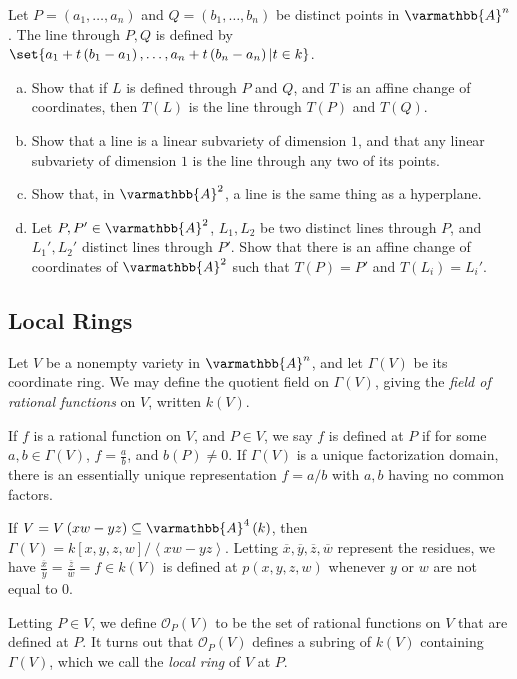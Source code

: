 \documentclass[10pt]{mypackage}
\renewcommand*{\mathbb}[1]{\varmathbb{#1}}
\newcommand{\A}{\mathbb{A}}
\begin{document}
\begin{exercise}[Exercise 2.15]
  Let $P = \left( a_1,\dots,a_n \right)$ and $Q = \left( b_1,\dots,b_n \right)$ be distinct points in $\A^n$. The line through $P,Q$ is defined by $\set{a_1 + t\left( b_1-a_1 \right),\dots,a_n + t\left( b_n-a_n \right) | t\in k}$.
  \begin{enumerate}[(a)]
    \item Show that if $L$ is defined through $P$ and $Q$, and $T$ is an affine change of coordinates, then $T(L)$ is the line through $T(P)$ and $T(Q)$.
    \item Show that a line is a linear subvariety of dimension $1$, and that any linear subvariety of dimension $1$ is the line through any two of its points.
    \item Show that, in $\A^2$, a line is the same thing as a hyperplane.
    \item Let $P,P'\in \A^2$, $L_1,L_2$ be two distinct lines through $P$, and $L_1',L_2'$ distinct lines through $P'$. Show that there is an affine change of coordinates of $\A^2$ such that $T(P)= P'$ and $T\left( L_i \right) = L_i'$.
  \end{enumerate}
\end{exercise}

\subsection{Local Rings}%
Let $V$ be a nonempty variety in $\A^n$, and let $\Gamma\left( V \right)$ be its coordinate ring. We may define the quotient field on $\Gamma(V)$, giving the \textit{field of rational functions} on $V$, written $k(V)$.\newline

If $f$ is a rational function on $V$, and $P\in V$, we say $f$ is defined at $P$ if for some $a,b\in \Gamma\left( V \right)$, $f = \frac{a}{b}$, and $b(P)\neq 0$. If $\Gamma(V)$ is a unique factorization domain, there is an essentially unique representation $f = a/b$ with $a,b$ having no common factors.
\begin{example}
  If $V = V\left( xw-yz \right)\subseteq \A^4\left( k \right)$, then $\Gamma(V) = k\left[ x,y,z,w \right]/\left\langle xw-yz \right\rangle$. Letting $ \overline{x}, \overline{y}, \overline{z}, \overline{w}$ represent the residues, we have $\frac{ \overline{x} }{ \overline{y} }= \frac{ \overline{z} }{ \overline{w} } = f\in k(V)$ is defined at $p \left( x,y,z,w \right)$ whenever $y$ or $w$ are not equal to $0$.
\end{example}
Letting $P\in V$, we define $\mathcal{O}_P(V)$ to be the set of rational functions on $V$ that are defined at $P$. It turns out that $\mathcal{O}_{P}(V)$ defines a subring of $k(V)$ containing $\Gamma(V)$, which we call the \textit{local ring} of $V$ at $P$.\newline
\end{document}
